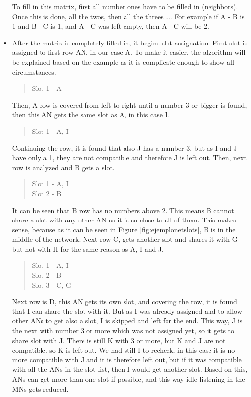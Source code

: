 \begin{itemize}
To fill in this matrix, first all number ones have to be filled in (neighbors). Once this is done, all the twos, then all the threes \ldots. For 
example if A - B is 1 and B - C is 1, and A - C was left empty, then A - C will be 2.
 \item After the matrix is completely filled in, it begins slot assignation. First slot is assigned to first row \ac{AN}, in our case A. To 
make it easier, the algorithm will be explained based on the example as it is complicate enough to show all circumstances.
\begin{quote}
 Slot 1 - A
\end{quote}
Then, A row is covered from left to right until a number 3 or bigger is found, then this \ac{AN} gets the same slot as A, in this case I.
\begin{quote}
 Slot 1 - A, I
\end{quote}
Continuing the row, it is found that also J has a number 3, but as I and J have only a 1, they are not compatible and therefore J is left out. 
Then, next row is analyzed and B gets a slot.
\begin{quote}
 Slot 1 - A, I \\ Slot 2 - B
\end{quote}
It can be seen that B row has no numbers above 2. This means B cannot share a slot with any other \ac{AN} as it is so close to all of them. 
This makes sense, because as it can be seen in Figure \ref{fig:ejemplonetslots}, B is in the middle of the network. Next row C, gets another
slot and shares it with G but not with H for the same reason as A, I and J.
\begin{quote}
 Slot 1 - A, I \\ Slot 2 - B \\ Slot 3 - C, G
\end{quote}
Next row is D, this \ac{AN} gets its own slot, and covering the row, it is found that I can share the slot with it. But as I was already 
assigned and to allow other \acp{AN} to get also a slot, I is skipped and left for the end. This way, J is the next with number 3 or more 
which was not assigned yet, so it gets to share slot with J. There is still K with 3 or more, but K and J are not compatible, so K is left out.
We had still I to recheck, in this case it is no more compatible with J and it is therefore left out, but if it was compatible with all the 
\acp{AN} in the slot list, then I would get another slot. Based on this, \acp{AN} can get more than one slot if possible, and this way 
idle listening in the \acp{MN} gets reduced.

\end{itemize}
